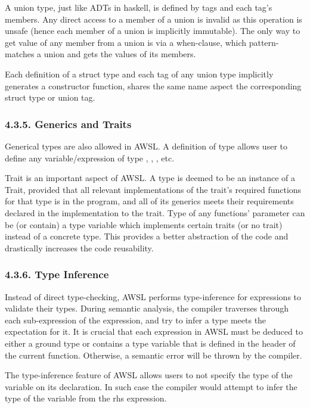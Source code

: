 \documentclass[10pt,a4paper]{report}
\begin{document}
  A union type, just like ADTs in haskell, is defined by tags and each tag's
  members. Any direct access to a member of a union is invalid as this operation
  is unsafe (hence each member of a union is implicitly immutable). The only way
  to get value of any member from a union is via a when-clause, which
  pattern-matches a union and gets the values of its members.

  Each definition of a struct type and each tag of any union type implicitly
  generates a constructor function, shares the same name aspect the
  corresponding struct type or union tag.

  \subsubsection*{4.3.5. Generics and Traits}
  Generical types are also allowed in AWSL. A definition of type
   allows user to define any variable/expression of type
  , ,
  , etc.

  Trait is an important aspect of AWSL. A type is deemed to be an instance of a
  Trait, provided that all relevant implementations of the trait's required
  functions for that type is in the program, and all of its generics meets their
  requirements declared in the implementation to the trait. Type of any
  functions' parameter can be (or contain) a type variable which implements
  certain traits (or no trait) instead of a concrete type. This provides a
  better abstraction of the code and drastically increases the code reusability. 

  \subsubsection*{4.3.6. Type Inference}
  Instead of direct type-checking, AWSL performs type-inference for expressions
  to validate their types. During semantic analysis, the compiler traverses
  through each sub-expression of the expression, and try to infer a type meets
  the expectation for it. It is crucial that each expression in AWSL must be
  deduced to either a ground type or contains a type variable that is defined in
  the header of the current function. Otherwise, a semantic error will be thrown
  by the compiler.

  The type-inference feature of AWSL allows users to not specify the type of the
  variable on its declaration. In such case the compiler would attempt to infer
  the type of the variable from the rhs expression.
\end{document}
